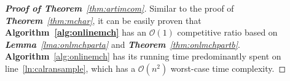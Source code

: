 \documentclass[10pt,journal,compsoc]{IEEEtran}
\begin{document}
\begin{proof} [\textbf{Proof of Theorem}~\ref{thm:artimcom}]
Similar to the proof of \textit{\textbf{Theorem}~\ref{thm:mchar}}, it can be easily proven that \textbf{Algorithm~\ref{alg:onlinemch}} has an $\mathcal{O}(1)$ competitive ratio based on \textit{\textbf{Lemma}~\ref{lma:onlmchparta}} and \textit{\textbf{Theorem}~\ref{thm:onlmchpartb}}. \textbf{Algorithm}~\ref{alg:onlinemch} has its running time predominantly spent on line~\ref{ln:calransample}, which has a $\mathcal{O}(n^2)$ worst-case time complexity.
\end{proof}
\end{document}
